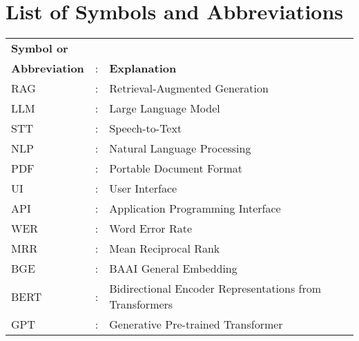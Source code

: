 \chapter*{List of Symbols and Abbreviations}

\begin{tabular}{lcl}
    \textbf{Symbol or}&&\\
    \textbf{Abbreviation} &:& \textbf{Explanation}\\
    
    
    RAG &:& Retrieval-Augmented Generation\\
    LLM &:& Large Language Model\\
    STT &:& Speech-to-Text\\
    NLP &:& Natural Language Processing\\
    PDF &:& Portable Document Format\\
    UI   &:& User Interface\\
    API  &:& Application Programming Interface\\
    WER  &:& Word Error Rate\\
    MRR  &:& Mean Reciprocal Rank\\
    BGE  &:& BAAI General Embedding\\
    BERT &:& Bidirectional Encoder Representations from Transformers\\
    GPT  &:& Generative Pre-trained Transformer\\
    
\end{tabular}

\clearpage